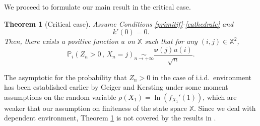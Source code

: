 \documentclass[12pt]{amsart}
\newtheorem{theorem}{Theorem}[section]
\theoremstyle{definition}
\numberwithin{equation}{section}
\def\bb#1{\mathbb{#1}}
\def\bs#1{\boldsymbol{#1}}
\begin{document}
We proceed to formulate our main result in the critical case.

\begin{theorem}[Critical case]
\label{prince}
Assume Conditions \ref{primitif}-\ref{cathedrale} and
\[
k'(0)  = 0.
\]
Then, there exists a positive function $u$ on $\bb X$ such that for any $(i,j) \in \bb X^2$,
\[
\bb P_i \left( Z_n > 0 \,,\, X_n = j \right) \underset{n \to +\infty}{\sim} \frac{\bs \nu (j) u(i)}{\sqrt{n}}.
\]
\end{theorem}

The asymptotic for the probability that   $ Z_n > 0 $ in the case of i.i.d.\ environment has been established earlier by Geiger and Kersting \cite{geiger_survival_2001}
under some moment assumptions on the random variable
$\rho(X_1)=\ln \left( f_{X_1}'(1) \right)$, 
which are weaker that our assumption on finiteness of the state space $\mathbb X.$
Since we deal with dependent environment, Theorem \ref{prince} is not covered by the results in \cite{geiger_survival_2001}.
\end{document}
